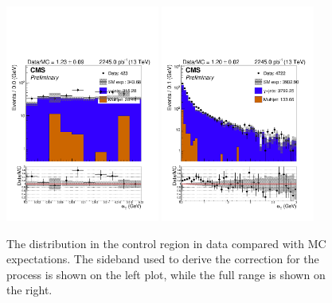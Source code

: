 \begin{figure}[!h]
  \centering
  \includegraphics[width=0.45\textwidth]{figures/sidebandCorr/alphaTSideband_NMinusOne_AlphaT_GJets}
  \includegraphics[width=0.45\textwidth]{figures/sidebandCorr/alphaT_NMinusOne_AlphaT_GJets}
  \caption{The \alphat distribution in the \gj control region in data compared with MC expectations. 
     The \alphat sideband used to derive the correction for the \gj process is shown on the left plot, while the full range is shown on the right.}
  \label{fig:gjets_alphaTsideband}
\end{figure}



